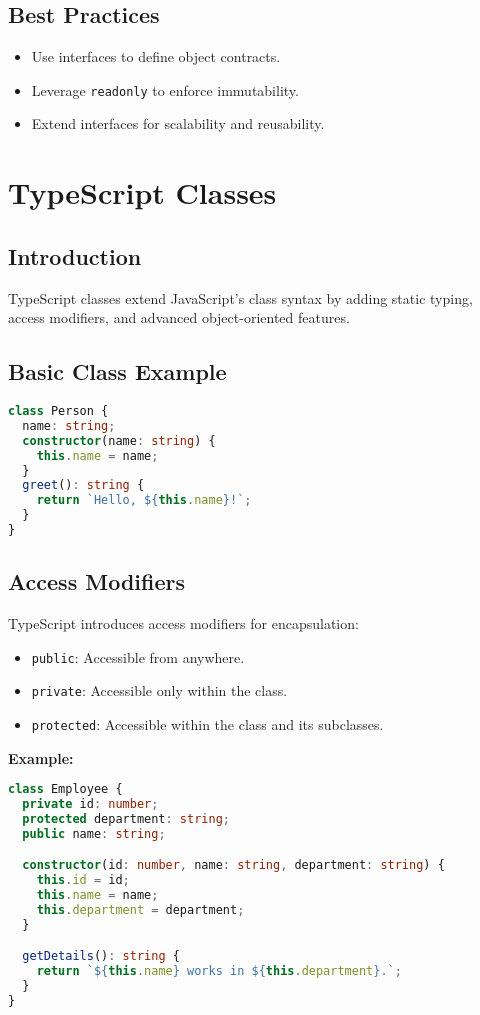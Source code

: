 \documentclass[a4paper,12pt]{article}
\begin{document}
\subsection*{Best Practices}
\begin{itemize}
    \item Use interfaces to define object contracts.
    \item Leverage \texttt{readonly} to enforce immutability.
    \item Extend interfaces for scalability and reusability.
\end{itemize}

\section{TypeScript Classes}
\subsection*{Introduction}
TypeScript classes extend JavaScript's class syntax by adding static typing, access modifiers, and advanced object-oriented features.

\subsection*{Basic Class Example}
\begin{lstlisting}[language=TypeScript]
class Person {
  name: string;
  constructor(name: string) {
    this.name = name;
  }
  greet(): string {
    return `Hello, ${this.name}!`;
  }
}
\end{lstlisting}

\subsection*{Access Modifiers}
TypeScript introduces access modifiers for encapsulation:
\begin{itemize}
    \item \texttt{public}: Accessible from anywhere.
    \item \texttt{private}: Accessible only within the class.
    \item \texttt{protected}: Accessible within the class and its subclasses.
\end{itemize}

\textbf{Example:}
\begin{lstlisting}[language=TypeScript]
class Employee {
  private id: number;
  protected department: string;
  public name: string;

  constructor(id: number, name: string, department: string) {
    this.id = id;
    this.name = name;
    this.department = department;
  }

  getDetails(): string {
    return `${this.name} works in ${this.department}.`;
  }
}
\end{lstlisting}
\end{document}
